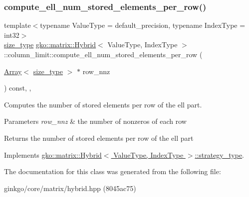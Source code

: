 \subsubsection{\texorpdfstring{compute\+\_\+ell\+\_\+num\+\_\+stored\+\_\+elements\+\_\+per\+\_\+row()}{compute\_ell\_num\_stored\_elements\_per\_row()}}
{\footnotesize\ttfamily template$<$typename Value\+Type = default\+\_\+precision, typename Index\+Type = int32$>$ \\
\hyperlink{namespacegko_a6e5c95df0ae4e47aab2f604a22d98ee7}{size\+\_\+type} \hyperlink{classgko_1_1matrix_1_1Hybrid}{gko\+::matrix\+::\+Hybrid}$<$ Value\+Type, Index\+Type $>$\+::column\+\_\+limit\+::compute\+\_\+ell\+\_\+num\+\_\+stored\+\_\+elements\+\_\+per\+\_\+row (\begin{DoxyParamCaption}\item[{\hyperlink{classgko_1_1Array}{Array}$<$ \hyperlink{namespacegko_a6e5c95df0ae4e47aab2f604a22d98ee7}{size\+\_\+type} $>$ $\ast$}]{row\+\_\+nnz }\end{DoxyParamCaption}) const\hspace{0.3cm}{\ttfamily [inline]}, {\ttfamily [override]}, {\ttfamily [virtual]}}



Computes the number of stored elements per row of the ell part. 


\begin{DoxyParams}{Parameters}
{\em row\+\_\+nnz} & the number of nonzeros of each row\\
\hline
\end{DoxyParams}
\begin{DoxyReturn}{Returns}
the number of stored elements per row of the ell part 
\end{DoxyReturn}


Implements \hyperlink{classgko_1_1matrix_1_1Hybrid_1_1strategy__type_a0a0cd4024f27c7d0f286f35fc0a6de60}{gko\+::matrix\+::\+Hybrid$<$ Value\+Type, Index\+Type $>$\+::strategy\+\_\+type}.



The documentation for this class was generated from the following file\+:\begin{DoxyCompactItemize}
\item 
ginkgo/core/matrix/hybrid.\+hpp (8045ac75)\end{DoxyCompactItemize}

